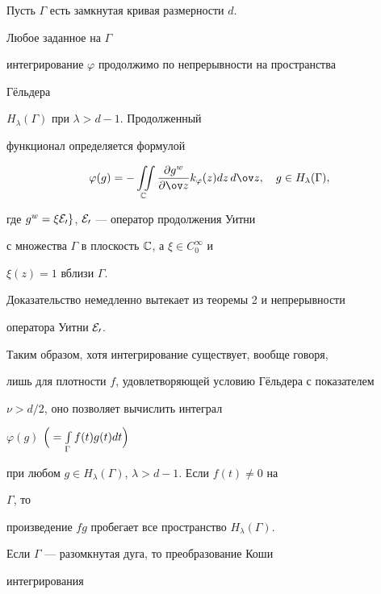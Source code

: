  


\begin{cor} Пусть $\Gamma$ есть замкнутая кривая размерности $d$. 


Любое заданное на $\Gamma$ 


интегрирование $\varphi$ продолжимо по непрерывности на пространства 


Г\"ельдера 


$H_\lambda(\Gamma)$ при $\lambda>d-1$. Продолженный 


функционал определяется формулой 


\begin{equation} 


\varphi(g)=-\iint\limits_{\Bbb C}\myfrac{g^w}{\ov z}k_\varphi(z)


dz\,d\ov z,\quad g\in H_\lambda(\Gamma), 


\end{equation} 


где $g^w=\xi\cal E_0g$, $\cal E_0$ --- оператор продолжения Уитни 


с множества $\Gamma$ в плоскость $\Bbb C$, а $\xi\in C^\infty_0$ и 


$\xi(z)=1$ вблизи $\Gamma$. 


\end{cor} 


 


Доказательство немедленно вытекает из теоремы 2 и непрерывности 


оператора Уитни $\cal E_0$.


 


Таким образом, хотя интегрирование существует, вообще говоря, 


лишь для плотности $f$, удовлетворяющей условию Г\"ельдера с показателем 


$\nu>d/2$, оно позволяет вычислить интеграл 


$\varphi(g)$\; $\Big(=\int\limits_\Gamma f(t)g(t)dt\Big)$ 


при любом $g\in H_\lambda(\Gamma)$, $\lambda>d-1$. Если $f(t)\ne 0$ на 


$\Gamma$, то 


произведение $fg$ пробегает все пространство $H_\lambda(\Gamma)$. 


 


Если $\Gamma$ --- разомкнутая дуга, то преобразование Коши 


интегрирования 


